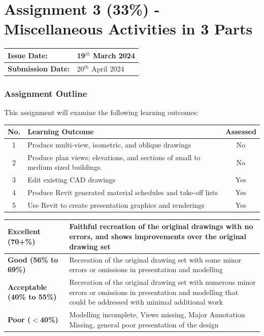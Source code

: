 
	

\part*{Assignment 3 (33\%) - Miscellaneous Activities in 3 Parts}



\begin{tabularx}{\textwidth}{ |X|X| }
	\hline
	\textbf{Issue Date:} & 19$^{th}$ March 2024 \\
	\hline 
	\textbf{Submission Date:}  & 20$^{th}$ April 2024  \\
	\hline
\end{tabularx}



\section*{Assignment Outline}

This assignment will examine the following learning outcomes:

\begin{tabularx}{\textwidth}{ |c|X|c| }
	\hline
	\textbf{No.} & \textbf{Learning Outcome} & \textbf{Assessed} \\
	\hline 
	1  & Produce multi-view, isometric, and oblique drawings & No \\
	2  & Produce plan views; elevations, and sections of small to medium sized buildings. & No \\
	3  & Edit existing CAD drawings & Yes \\
	4  & Produce Revit generated material schedules and take-off lists & Yes \\
	5  & Use Revit to create presentation graphics and renderings & Yes \\
	\hline
\end{tabularx}

\vspace{1cm}

\begin{tabularx}{\textwidth}{ |l|X| }
	\hline 
	\textbf{Excellent (70+\%)} & Faithful recreation of the original drawings with no errors, and shows improvements over the original drawing set\\ 
	\hline
	\textbf{Good (56\% to 69\%)} & Recreation of the original drawing set with some minor errors or omissions in presentation and modelling \\
	\hline
	\textbf{Acceptable (40\% to 55\%)} & Recreation of the original drawing set with numerous minor errors or omissions in presentation and modelling that could be addressed with minimal additional work \\ 
	\hline
	\textbf{Poor ($<$40\%)} & Modelling incomplete, Views missing, Major Annotation Missing, general poor presentation of the design  \\
	\hline
\end{tabularx}

